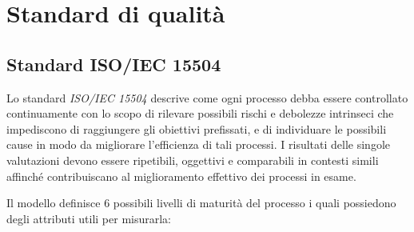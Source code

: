 \documentclass[12pt,a4paper]{article}
\begin{document}
\newpage

\section{Standard di qualità}\label{standard}

\subsection{Standard ISO/IEC 15504}
Lo standard \textit{ISO/IEC 15504} descrive come ogni processo debba essere controllato continuamente con lo scopo di rilevare possibili rischi e debolezze intrinseci che impediscono di raggiungere gli obiettivi prefissati, e di individuare le possibili cause in modo da migliorare l'efficienza di tali processi. I risultati delle singole valutazioni devono essere ripetibili, oggettivi e comparabili in contesti simili affinché contribuiscano al miglioramento effettivo dei processi in esame.

Il modello  definisce 6 possibili livelli di maturità del processo i quali possiedono degli attributi utili per misurarla:
\end{document}
